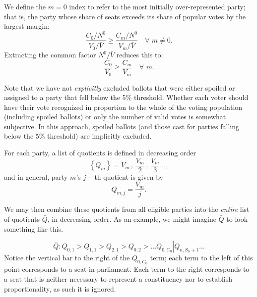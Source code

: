 \documentclass[DIV=calc, paper=a4, fontsize=11pt, twocolumn]{scrartcl}	 %
\begin{document}
We define the $m=0$ index to refer to the most initially over-represented party; that is, the party whose share of seats exceeds its share of popular votes by the largest margin:
\begin{equation}
\frac{C_0/N^0}{V_0/\bar{V}} \ge \frac{C_m/N^0}{V_m/\bar{V}} \,\, \,\,\,\, \forall \,\, m \neq 0.
\end{equation}
Extracting the common factor $N^0/\bar{V}$ reduces this to:
\begin{equation}
\label{eq:most_overrep}
\frac{C_0}{V_0} \ge \frac{C_m}{V_m} \,\, \,\,\,\, \forall \,\, m.
\end{equation}

Note that we have not \emph{explicitly} excluded ballots that were either spoiled or assigned to a party that fell below the 5\% threshold. Whether each voter should have their vote recognized in proportion to the whole of the voting population (including spoiled ballots) or only the number of valid votes is somewhat subjective. In this approach, spoiled ballots (and those cast for parties falling below the 5\% threshold) are implicitly excluded.


For each party, a list of quotients is defined in decreasing order
\begin{equation}
\label{eq:Qm_def}
\left\{ Q_m \right\} = V_m \, , \, \frac{V_m}{2} \, , \, \frac{V_m}{3} \ldots,
\end{equation}
and in general, party $m$'s $j-$th quotient is given by
\begin{equation}
\label{eq:Qmj_def}
Q_{m,j} = \frac{V_m}{j}.
\end{equation}

We may then combine these quotients from all eligible parties into the \emph{entire} list of quotients $\bar Q$, in decreasing order. As an example, we might imagine $\bar Q$ to look something like this.

\begin{equation}
\label{eq:Qbar_def}
\bar Q:  \left. Q_{0,1} > Q_{1,1} > Q_{2,1} >  Q_{0,2} > \ldots  Q_{0,C_0}  \right| Q_{n,S_{n}+1} \ldots 
\end{equation}
Notice the vertical bar to the right of the $Q_{0,C_0}$ term; each term to the left of this point corresponds to a seat in parliament. Each term to the right corresponds to a seat that is neither necessary to represent a constituency nor to establish proportionality, as such it is ignored.
\end{document}
